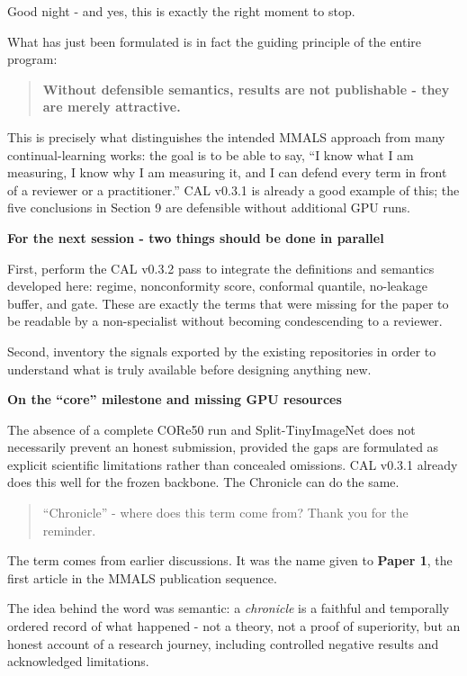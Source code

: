 Good night - and yes, this is exactly the right moment to stop.

What has just been formulated is in fact the guiding principle of the entire program:

\begin{quote}
\textbf{Without defensible semantics, results are not publishable - they are merely attractive.}
\end{quote}

This is precisely what distinguishes the intended MMALS approach from many continual-learning works: the goal is to be able to say, ``I know what I am measuring, I know why I am measuring it, and I can defend every term in front of a reviewer or a practitioner.'' CAL v0.3.1 is already a good example of this; the five conclusions in Section 9 are defensible without additional GPU runs.

\textbf{For the next session - two things should be done in parallel}

First, perform the CAL v0.3.2 pass to integrate the definitions and semantics developed here: regime, nonconformity score, conformal quantile, no-leakage buffer, and gate. These are exactly the terms that were missing for the paper to be readable by a non-specialist without becoming condescending to a reviewer.

Second, inventory the signals exported by the existing repositories in order to understand what is truly available before designing anything new.

\textbf{On the ``core'' milestone and missing GPU resources}

The absence of a complete CORe50 run and Split-TinyImageNet does not necessarily prevent an honest submission, provided the gaps are formulated as explicit scientific limitations rather than concealed omissions. CAL v0.3.1 already does this well for the frozen backbone. The Chronicle can do the same.

\begin{quote}
``Chronicle'' - where does this term come from? Thank you for the reminder.
\end{quote}

The term comes from earlier discussions. It was the name given to \textbf{Paper 1}, the first article in the MMALS publication sequence.

The idea behind the word was semantic: a \emph{chronicle} is a faithful and temporally ordered record of what happened - not a theory, not a proof of superiority, but an honest account of a research journey, including controlled negative results and acknowledged limitations.

